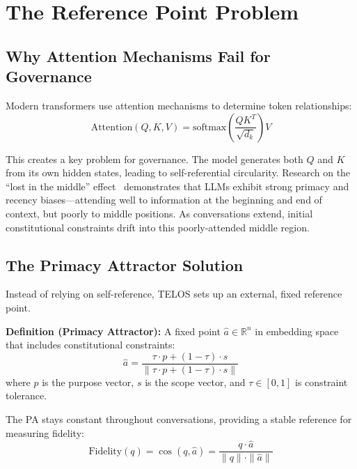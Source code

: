 \documentclass[11pt,twocolumn]{article}
\begin{document}
\section{The Reference Point Problem}

\subsection{Why Attention Mechanisms Fail for Governance}

Modern transformers use attention mechanisms to determine token relationships:
\begin{equation}
    \text{Attention}(Q,K,V) = \text{softmax}\left(\frac{QK^T}{\sqrt{d_k}}\right)V
\end{equation}

This creates a key problem for governance. The model generates both $Q$ and $K$ from its own hidden states, leading to self-referential circularity. Research on the ``lost in the middle'' effect~\citep{liu2024lost} demonstrates that LLMs exhibit strong primacy and recency biases---attending well to information at the beginning and end of context, but poorly to middle positions. As conversations extend, initial constitutional constraints drift into this poorly-attended middle region.

\subsection{The Primacy Attractor Solution}

Instead of relying on self-reference, TELOS sets up an external, fixed reference point.

\textbf{Definition (Primacy Attractor):} A fixed point $\hat{a} \in \mathbb{R}^n$ in embedding space that includes constitutional constraints:
\begin{equation}
    \hat{a} = \frac{\tau \cdot p + (1-\tau) \cdot s}{\|\tau \cdot p + (1-\tau) \cdot s\|}
\end{equation}
where $p$ is the purpose vector, $s$ is the scope vector, and $\tau \in [0,1]$ is constraint tolerance.

The PA stays constant throughout conversations, providing a stable reference for measuring fidelity:
\begin{equation}
    \text{Fidelity}(q) = \cos(q, \hat{a}) = \frac{q \cdot \hat{a}}{\|q\| \cdot \|\hat{a}\|}
\end{equation}
\end{document}
